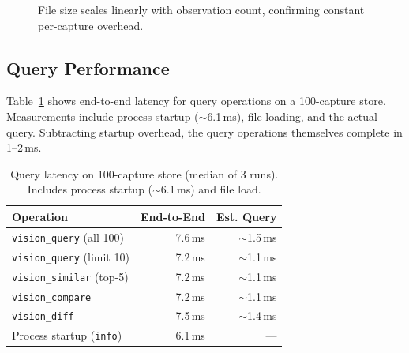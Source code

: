 \documentclass[10pt, twocolumn]{article}
\begin{document}
\begin{figure}[t]
\centering
{}
\caption{File size scales linearly with observation count, confirming constant per-capture overhead.}
\label{fig:storage}
\end{figure}

\subsection{Query Performance}

Table~\ref{tab:query} shows end-to-end latency for query operations on a 100-capture store. Measurements include process startup ($\sim$6.1\,ms), file loading, and the actual query. Subtracting startup overhead, the query operations themselves complete in 1--2\,ms.

\begin{table}[t]
\caption{Query latency on 100-capture store (median of 3 runs). Includes process startup ($\sim$6.1\,ms) and file load.}
\label{tab:query}
\centering
\small
\begin{tabular}{@{}lrr@{}}
\toprule
\textbf{Operation} & \textbf{End-to-End} & \textbf{Est. Query} \\
\midrule
\texttt{vision\_query} (all 100) & 7.6\,ms & $\sim$1.5\,ms \\
\texttt{vision\_query} (limit 10) & 7.2\,ms & $\sim$1.1\,ms \\
\texttt{vision\_similar} (top-5) & 7.2\,ms & $\sim$1.1\,ms \\
\texttt{vision\_compare} & 7.2\,ms & $\sim$1.1\,ms \\
\texttt{vision\_diff} & 7.5\,ms & $\sim$1.4\,ms \\
\midrule
Process startup (\texttt{info}) & 6.1\,ms & --- \\
\bottomrule
\end{tabular}
\end{table}
\end{document}
